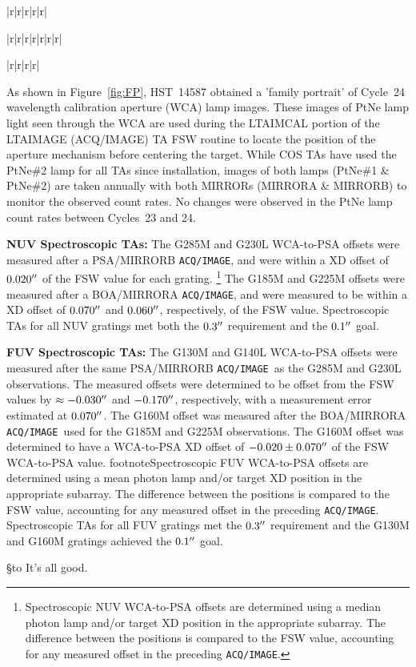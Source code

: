 \documentclass[12pt]{reportj}
\def\arcsec{\hbox{$^{\prime\prime}$}}
\def\ssection#1{\addtocounter{section}{1} \setcounter{subsection}{0} \S*{\hbox to \hsize{\large\bf \arabic{section}. #1\hfill }}}
\begin{document}
\begin{deluxetable}{|r|r|r|r|r|}
\begin{deluxetable}{|r|r|r|r|r|r|r|}
\begin{deluxetable}{|r|r|r|r|}
\begin{description}
	As shown in Figure~\ref{fig:FP}, HST~14587 obtained a 'family portrait' of Cycle~24 wavelength calibration aperture (WCA) lamp images. These images of PtNe lamp light seen through the WCA
	are used during the LTAIMCAL portion of the LTAIMAGE (ACQ/IMAGE) TA FSW routine to locate the position of the aperture mechanism before centering the target.
	While COS TAs have used the PtNe\#2 lamp for all TAs since installation, images of both lamps (PtNe\#1 \& PtNe\#2) are taken annually with both MIRRORs
	(MIRRORA \& MIRRORB) to monitor the observed count rates. No changes were observed in the PtNe lamp count rates between Cycles~23 and 24.
	\clearpage
\item{\bf NUV Spectroscopic TAs:}
	The G285M and G230L WCA-to-PSA offsets were measured after a PSA/MIRRORB \texttt{ACQ/IMAGE}, and were within a XD offset of $0.020\arcsec$ of the FSW value for each grating.
	\footnote{Spectroscopic NUV WCA-to-PSA offsets are determined using a median photon lamp and/or target XD position in the appropriate subarray. The difference between the positions is compared to the FSW value, accounting for any measured offset in the preceding \texttt{ACQ/IMAGE}.}
	The G185M and G225M offsets were measured after a BOA/MIRRORA \texttt{ACQ/IMAGE}, and were measured to be within a XD offset of $0.070\arcsec$ and $0.060\arcsec$, respectively, of the FSW value.
	Spectroscopic TAs for all NUV gratings met both the $0.3\arcsec$ requirement and the $0.1\arcsec$ goal.
\item{\bf FUV Spectroscopic TAs:}
	The G130M and G140L WCA-to-PSA offsets were measured after the same PSA/MIRRORB \texttt{ACQ/IMAGE}~as the G285M and G230L observations.
	The measured offsets were determined to be offset from the FSW values by $\approx -0.030\arcsec$ and $-0.170\arcsec$, respectively, with a measurement error estimated at $0.070\arcsec$.
	The G160M offset was measured after the BOA/MIRRORA \texttt{ACQ/IMAGE}~used for the G185M and G225M observations. The G160M offset was determined to have a WCA-to-PSA XD offset of $-0.020 \pm 0.070\arcsec$ of the FSW WCA-to-PSA value.
footnote{Spectroscopic FUV WCA-to-PSA offsets are determined using a mean photon lamp and/or target XD position in the appropriate subarray. The difference between the positions is compared to the FSW value, accounting for any measured offset in the preceding \texttt{ACQ/IMAGE}.}
	Spectroscopic TAs for all FUV gratings met the $0.3\arcsec$ requirement and the G130M and G160M gratings achieved the $0.1\arcsec$ goal.

\end{description}
\vspace{-0.3cm}
\ssection{Conclusions.\label{theend} }
\vspace{-0.3cm}
	It's all good.


\end{deluxetable}
\end{deluxetable}
\end{deluxetable}
\end{document}
